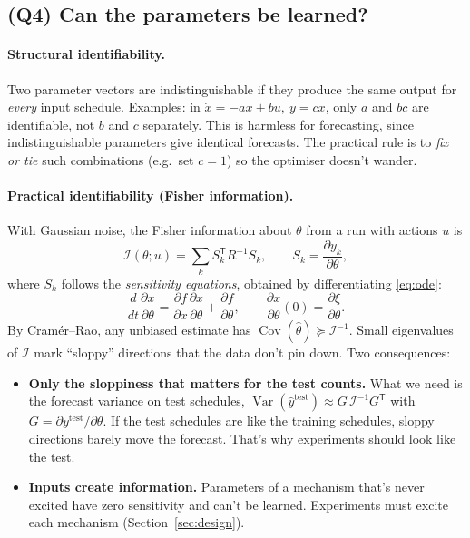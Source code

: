 \documentclass[11pt]{article}
\theoremstyle{plain}
\theoremstyle{definition}
\theoremstyle{remark}
\newcommand{\tr}{\mathsf{T}}
\begin{document}
\subsection{(Q4) Can the parameters be learned?}
\paragraph{Structural identifiability.} Two parameter vectors are indistinguishable if they produce the same output for \emph{every} input schedule. Examples: in $\dot x=-a x+bu,\ y=cx$, only $a$ and $bc$ are identifiable, not $b$ and $c$ separately. This is harmless for forecasting, since indistinguishable parameters give identical forecasts. The practical rule is to \emph{fix or tie} such combinations (e.g.\ set $c=1$) so the optimiser doesn't wander.

\paragraph{Practical identifiability (Fisher information).} With Gaussian noise, the Fisher information about $\theta$ from a run with actions $u$ is
\begin{equation}\label{eq:fisher}
\mathcal I(\theta;u)=\sum_{k}S_k^\tr R^{-1}S_k,\qquad S_k=\frac{\partial y_k}{\partial\theta},
\end{equation}
where $S_k$ follows the \emph{sensitivity equations}, obtained by differentiating \eqref{eq:ode}:
\begin{equation}
\frac{d}{dt}\frac{\partial x}{\partial\theta}=\frac{\partial f}{\partial x}\frac{\partial x}{\partial\theta}+\frac{\partial f}{\partial\theta},\qquad \frac{\partial x}{\partial\theta}(0)=\frac{\partial\xi}{\partial\theta}.
\end{equation}
By Cramér--Rao, any unbiased estimate has $\operatorname{Cov}(\hat\theta)\succeq\mathcal I^{-1}$. Small eigenvalues of $\mathcal I$ mark ``sloppy'' directions that the data don't pin down. Two consequences:
\begin{itemize}
\item \textbf{Only the sloppiness that matters for the test counts.} What we need is the forecast variance on test schedules, $\operatorname{Var}(\hat y^{\text{test}})\approx G\,\mathcal I^{-1}G^\tr$ with $G=\partial y^{\text{test}}/\partial\theta$. If the test schedules are like the training schedules, sloppy directions barely move the forecast. That's why experiments should look like the test.
\item \textbf{Inputs create information.} Parameters of a mechanism that's never excited have zero sensitivity and can't be learned. Experiments must excite each mechanism (Section~\ref{sec:design}).
\end{itemize}
\end{document}
